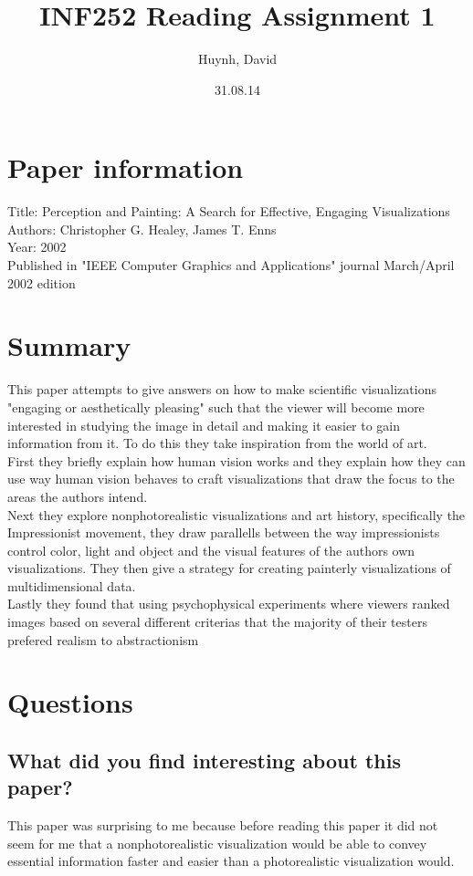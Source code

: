 \documentclass{article}
\begin{document}
\title{INF252 Reading Assignment 1}
\author{Huynh, David}
\date{31.08.14}

\maketitle

\section{Paper information}
Title: Perception and Painting: A Search for Effective, Engaging Visualizations\\
Authors: Christopher G. Healey, James T. Enns\\
Year: 2002\\
Published in  "IEEE Computer Graphics and Applications" journal March/April 2002 edition

\section{Summary}
This paper attempts to give answers on how to make scientific visualizations "engaging or aesthetically pleasing" such that the viewer will become more interested in studying the image in detail and making it easier to gain information from it. To do this they take inspiration from the world of art.\\
First they briefly explain how human vision works and they explain how they can use way human vision behaves to craft visualizations that draw the focus to the areas the authors intend.\\
Next they explore nonphotorealistic visualizations and art history, specifically the Impressionist movement, they draw parallells between the way impressionists control color, light and object and the visual features of the authors own visualizations. They then give a strategy for creating painterly visualizations of multidimensional data.\\
Lastly they found that using psychophysical experiments where viewers ranked images based on several different criterias that the majority of their testers prefered realism to abstractionism

\section{Questions}

\subsection*{What did you find interesting about this paper?}
This paper was surprising to me because before reading this paper it did not seem for me that a nonphotorealistic visualization would be able to convey essential information faster and easier than a photorealistic visualization would. 
\end{document}
